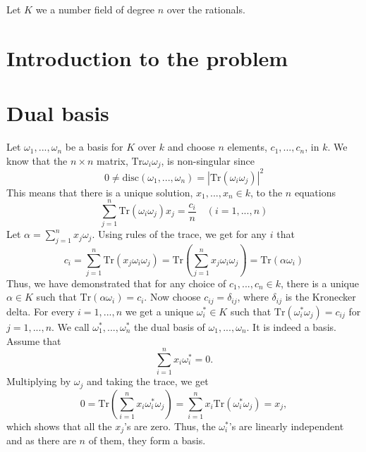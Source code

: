 \documentclass{article}
\newcommand{\tr}{\text{Tr}}
\begin{document}

\tableofcontents



Let $K$ we a number field of degree $n$ over the rationals.






\section{Introduction to the problem}

\section{Dual basis}
Let $\omega_1, ..., \omega_n$ be a basis for $K$ over $k$ and choose $n$ elements, $c_1, ..., c_n$, in $k$. We know that the $n \times n$ matrix, $\tr {\omega_i \omega_j}$, is non-singular since $$0 \neq \text{disc}(\omega_1, ..., \omega_n) = |\tr(\omega_i \omega_j)|^2$$
This means that there is a unique solution, $x_1, ..., x_n \in k$, to the $n$ equations
$$\sum_{j=1}^n \tr(\omega_i \omega_j) x_j = \frac{c_i}{n} \quad (i = 1, ..., n)$$
Let $\alpha = \sum_{j=1}^n x_j \omega_j$. Using rules of the trace, we get for any $i$ that
$$c_i = \sum_{j=1}^n \tr(x_j \omega_i \omega_j) = \tr(\sum_{j=1}^n x_j \omega_i \omega_j) = \tr(\alpha \omega_i)$$
Thus, we have demonstrated that for any choice of $c_1, ..., c_n \in k$, there is a unique $\alpha \in K$ such that $\tr(\alpha \omega_i)= c_i$. Now choose $c_{ij} = \delta_{ij}$, where $\delta_{ij}$ is the Kronecker delta. For every $i = 1, ..., n$ we get a unique $\omega_i^* \in K$ such that $\tr(\omega_i^* \omega_j) = c_{ij}$ for $j = 1, ..., n$. We call $\omega_1^*, ..., \omega_n^*$ the dual basis of $\omega_1, ..., \omega_n$. It is indeed a basis. Assume that 
$$\sum_{i=1}^n x_i \omega_i^* = 0.$$
Multiplying by $\omega_j$ and taking the trace, we get
$$0 = \tr(\sum_{i=1}^n x_i \omega_i^* \omega_j) = \sum_{i=1}^n x_i \tr(\omega_i^* \omega_j) = x_j,$$
which shows that all the $x_j$'s are zero. Thus, the $\omega_i^*$'s are linearly independent and as there are $n$ of them, they form a basis.
\end{document}
